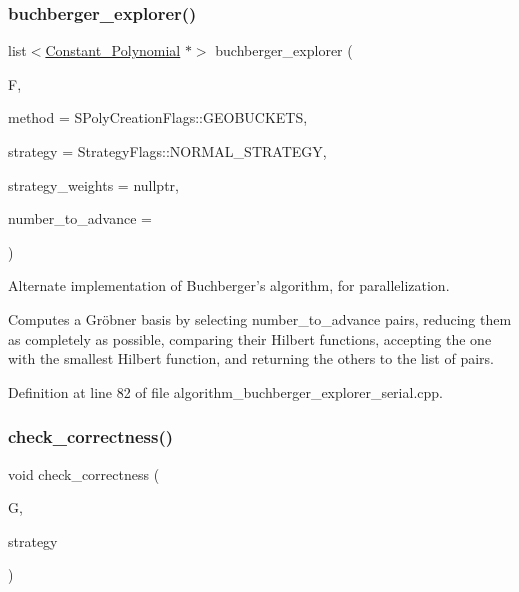 \subsubsection{\texorpdfstring{buchberger\+\_\+explorer()}{buchberger\_explorer()}\hspace{0.1cm}{\footnotesize\ttfamily [2/2]}}
{\footnotesize\ttfamily list$<$\hyperlink{group__polygroup_class_constant___polynomial}{Constant\+\_\+\+Polynomial} $\ast$$>$ buchberger\+\_\+explorer (\begin{DoxyParamCaption}\item[{const list$<$ \hyperlink{group__polygroup_class_abstract___polynomial}{Abstract\+\_\+\+Polynomial} $\ast$$>$ \&}]{F,  }\item[{\hyperlink{group___g_b_computation_ga73257b8a2d5cc826853a71b77d0cebf2}{S\+Poly\+Creation\+Flags}}]{method = {\ttfamily SPolyCreationFlags\+:\+:GEOBUCKETS},  }\item[{\hyperlink{group__strategygroup_ga0ee6c8e033547330e6b89929730007f4}{Strategy\+Flags}}]{strategy = {\ttfamily StrategyFlags\+:\+:NORMAL\+\_\+STRATEGY},  }\item[{W\+T\+\_\+\+T\+Y\+PE $\ast$}]{strategy\+\_\+weights = {\ttfamily nullptr},  }\item[{const unsigned}]{number\+\_\+to\+\_\+advance = {} }\end{DoxyParamCaption})}



Alternate implementation of Buchberger's algorithm, for parallelization. 

Computes a Gr\"{o}bner basis by selecting {\ttfamily number\+\_\+to\+\_\+advance} pairs, reducing them as completely as possible, comparing their Hilbert functions, accepting the one with the smallest Hilbert function, and returning the others to the list of pairs. 

Definition at line 82 of file algorithm\+\_\+buchberger\+\_\+explorer\+\_\+serial.\+cpp.

\mbox{\label{group___g_b_computation_gaf48f43667991b8526303601bbc0709cf}} 
\subsubsection{\texorpdfstring{check\+\_\+correctness()}{check\_correctness()}}
{\footnotesize\ttfamily void check\+\_\+correctness (\begin{DoxyParamCaption}\item[{list$<$ \hyperlink{group__polygroup_class_constant___polynomial}{Constant\+\_\+\+Polynomial} $\ast$$>$}]{G,  }\item[{\hyperlink{group__strategygroup_ga0ee6c8e033547330e6b89929730007f4}{Strategy\+Flags}}]{strategy }\end{DoxyParamCaption})}



